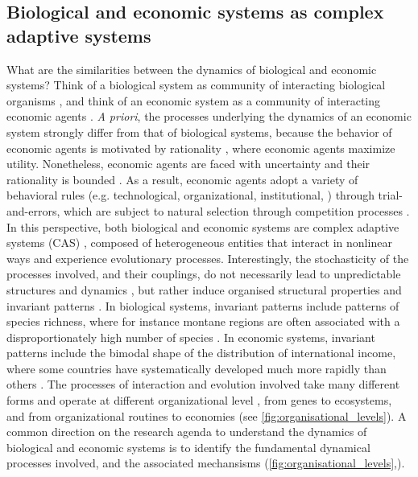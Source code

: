 \subsection{Biological and economic systems as complex adaptive systems}
What are the similarities between the dynamics of biological and economic systems? 
% 
Think of a biological system as community of interacting biological organisms \citep{chapin2002principles}, and think of an economic system as a community of interacting economic agents \citep{Dopfer2007}.
% 
\textit{A priori}, the processes underlying the dynamics of an economic system strongly differ from that of biological systems, because the behavior of economic agents is motivated by rationality \citep{XXX}, where economic agents maximize utility. 
% 
Nonetheless, economic agents are faced with uncertainty \citep{Foster2012} and their rationality is bounded \citep{HerbertSimon}. As a result, economic agents adopt a variety of behavioral rules (e.g. technological, organizational, institutional, \cite{Foster2012}) through trial-and-errors, which are subject to natural selection through competition processes \citep{Schumpeter}.
% 
In this perspective, both biological and economic systems are complex adaptive systems (CAS) \citep{Levin2002}, composed of heterogeneous entities that interact in nonlinear ways and experience evolutionary processes. 
% 
% 
Interestingly, the stochasticity of the processes involved, and their couplings, do not necessarily lead to unpredictable structures and dynamics \citep{Olff2009}, but rather induce organised structural properties and invariant patterns \citep{Olff2009,mitchell2009complexity}. 
% 
In biological systems, invariant patterns include patterns of species richness, where for instance montane regions are often associated with a disproportionately high number of species \citep{Rahbek2019}. In economic systems, invariant patterns include the bimodal shape of the distribution of international income, where some countries have systematically developed much more rapidly than others \citep{acemoglu2001colonial}. 
% 
The processes of interaction and evolution involved take many different forms and operate at different organizational level \citep{Levin1998}, from genes to ecosystems, and from organizational routines to economies (see \cref{fig:organisational_levels}).
% 
A common direction on the research agenda to understand the dynamics of biological and economic systems is to identify the fundamental dynamical processes involved, and the associated mechansisms (\cref{fig:organisational_levels},\cite{Nordbotten2018}).
